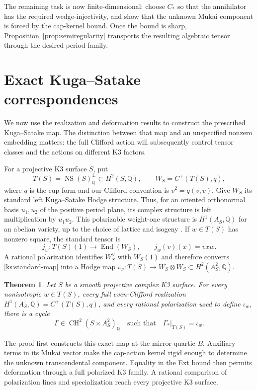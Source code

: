 \documentclass[11pt]{article}
\numberwithin{equation}{section}
\newtheorem{theorem}{Theorem}[section]
\theoremstyle{definition}
\theoremstyle{remark}
\newcommand{\Q}{\mathbb Q}
\DeclareMathOperator{\End}{End}
\DeclareMathOperator{\NS}{NS}
\DeclareMathOperator{\CH}{CH}
\begin{document}
The remaining task is now finite-dimensional: choose \(C_*\) so that
the annihilator has the required wedge-injectivity, and show that the
unknown Mukai component is forced by the cap-kernel bound.  Once the
bound is sharp, Proposition~\ref{prop:semiregularity} transports the
resulting algebraic tensor through the desired period family.

\section{Exact Kuga--Satake correspondences}
\label{sec:exactks}

We now use the realization and deformation results to construct the
prescribed Kuga--Satake map.  The distinction between that map and an
unspecified nonzero embedding matters: the full Clifford action will
subsequently control tensor classes and the actions on different K3
factors.

For a projective K3 surface $S$, put
\[
 T(S)=\NS(S)_{\Q}^{\perp}\subset H^2(S,\Q),
 \qquad W_S=C^+(T(S),q),
\]
where $q$ is the cup form and our Clifford convention is
$v^2=q(v,v)$.  Give $W_S$ its standard left Kuga--Satake Hodge
structure.  Thus, for an oriented orthonormal basis $u_1,u_2$ of
the positive period plane, its complex structure is left
multiplication by $u_1u_2$.  This polarizable weight-one structure
is $H^1(A_S,\Q)$ for an abelian variety, up to the choice of lattice
and isogeny \cite{KugaSatake,DeligneK3,VanGeemenKS}.  If
$w\in T(S)$ has nonzero square, the standard tensor is
\begin{equation}
 \label{ks:standard-map}
 j_w:T(S)(1)\longrightarrow\End(W_S),
 \qquad j_w(v)(x)=vxw.
\end{equation}
A rational polarization identifies $W_S^\vee$ with $W_S(1)$ and
therefore converts \eqref{ks:standard-map} into a Hodge map
$\iota_w:T(S)\to W_S\otimes W_S\subset H^2(A_S^2,\Q)$.

\begin{theorem}
 \label{thm:exact-ks}
Let $S$ be a smooth projective complex K3 surface.  For every
nonisotropic $w\in T(S)$, every full even-Clifford realization
$H^1(A_S,\Q)=C^+(T(S),q)$, and every rational polarization used
to define $\iota_w$, there is a cycle
\[
 \Gamma\in\CH^2(S\times A_S^2)_{\Q}
 \quad\text{such that}\quad
 \Gamma_*|_{T(S)}=\iota_w.
\]
\end{theorem}

The proof first constructs this exact map at the mirror quartic
$B$.  Auxiliary terms in its Mukai vector make the cap-action
kernel rigid enough to determine the unknown transcendental
component.  Equality in the Ext bound then permits deformation
through a full polarized K3 family.  A rational comparison of
polarization lines and specialization reach every projective K3
surface.
\end{document}
